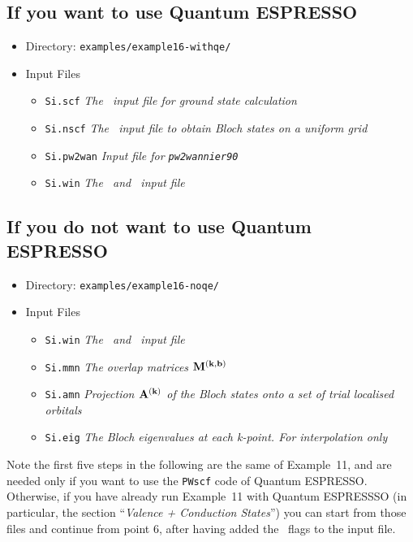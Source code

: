 \documentclass[a4paper,11pt,twoside]{article}
\begin{document}
\subsection*{If you want to use Quantum ESPRESSO}
\begin{itemize}
\item{Directory: {\tt examples/example16-withqe/}}
\item{Input Files}
\begin{itemize}
\item{ {\tt Si.scf}  {\it The \pwscf\ input file for ground state
    calculation}} 
\item{ {\tt Si.nscf}  {\it The \pwscf\ input file to obtain Bloch
    states on a uniform grid}} 
\item{ {\tt Si.pw2wan}  {\it Input file for {\tt pw2wannier90}}}
\item{ {\tt Si.win}  {\it The \wannier\ and \postw\ input file}}\
\end{itemize}
\end{itemize}
\subsection*{If you do not want to use Quantum ESPRESSO}
\begin{itemize}
\item{Directory: {\tt examples/example16-noqe/}}
\item{Input Files}
\begin{itemize}
\item{ {\tt Si.win}  {\it The \wannier\ and \postw\ input file}}
\item{ {\tt Si.mmn}  {\it The overlap matrices $\mathbf{M}^{(\mathbf{k},\mathbf{b})}$}}
\item{ {\tt Si.amn}  {\it Projection $\mathbf{A}^{(\mathbf{k})}$ of the Bloch states onto a set
    of trial localised orbitals}} 
\item{ {\tt Si.eig}  {\it The Bloch eigenvalues at each k-point. For
    interpolation only}} 
\end{itemize}
\end{itemize}

Note the first five steps in the following are the same of Example~11, and
are needed only if you want to use the \texttt{PWscf} code of Quantum ESPRESSO.
Otherwise, if you have already run Example~11 with Quantum ESPRESSSO 
(in particular, the section ``\emph{Valence + Conduction States}'')
you can start from those files and continue from point 6, after having
added the \bw\ flags to the input file.
\end{document}

